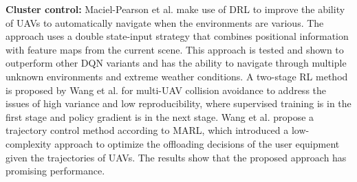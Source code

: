 \documentclass[acmsmall]{acmart}
\begin{document}
\textbf{Cluster control:} Maciel-Pearson et al. \cite{maciel2019online} make use of DRL to improve the ability of UAVs to automatically navigate when the environments are various. The approach uses a double state-input strategy that combines positional information with feature maps from the current scene. This approach is tested and shown to outperform other DQN variants and has the ability to navigate through multiple unknown environments and extreme weather conditions. A two-stage RL method is proposed by Wang et al. \cite{9001167} for multi-UAV collision avoidance to address the issues of high variance and low reproducibility, where supervised training is in the first stage and policy gradient is in the next stage. Wang et al. \cite{9209079} propose a trajectory control method according to MARL, which introduced a low-complexity approach to optimize the offloading decisions of the user equipment given the trajectories of UAVs. The results show that the proposed approach has promising performance. 
\end{document}
